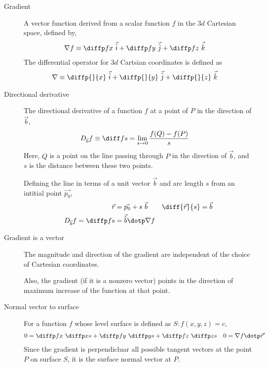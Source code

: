 \begin{description}
    \item[Gradient] A vector function derived from a scalar function $ f $ in the $ 3d $
          Cartesian space, defined by,
          \begin{align}
              \nabla f & \equiv \diffp fx\ \vec{\hat{i}} + \diffp fy\ \vec{\hat{j}}
              + \diffp fz\ \vec{\hat{k}}
          \end{align}
          The differential operator for $ 3d $ Cartsian coordinates is defined as
          \begin{align}
              \nabla & \equiv \diffp {}{x}\ \vec{\hat{i}} + \diffp {}{y}\ \vec{\hat{j}}
              + \diffp {}{z}\ \vec{\hat{k}}
          \end{align}

    \item[Directional derivative] The directional derivative of a function $ f $ at a
          point of $ P $ in the direction of $ \vec{b} $,
          \begin{align}
              D_{\vec{b}}f & \equiv \diff fs =
              \lim_{s \to 0} \frac{f(Q) - f(P)}{s}
          \end{align}
          Here, $ Q $ is a point on the line passing through $ P $ in the direction of
          $ \vec{b} $, and $ s $ is the distance between these two points. \par
          Defining the line in terms of a unit vector $ \vec{b} $ and arc length $ s $ from
          an intitial point $ \vec{p_0} $,
          \begin{align}
              \vec{r}                  & = \vec{p_0} + s\ \vec{b}       &
              \diff{\vec{r}}{s}        & = \vec{b}                        \\
              D_{\vec{b}}f = \diffp fs & = \vec{\hat{b}} \dotp \nabla f
          \end{align}

    \item[Gradient is a vector] The magnitude and direction of the gradient are
          independent of the choice of Cartesian coordinates. \par
          Also, the gradient (if it is a nonzero vector) points in the direction of maximum
          increase of the function at that point.

    \item[Normal vector to surface] For a function $ f $ whose level surface is defined
          as $ S : f(x, y, z) = c $,
          \begin{align}
              0 & = \diffp fx\ \diffp xs + \diffp fy\ \diffp ys + \diffp fz\ \diffp zs &
              0 & = \nabla f \dotp \vec{r}'
          \end{align}
          Since the gradient is perpendicluar all possible tangent vectors at the point
          $ P $ on surface $ S $, it is the surface normal vector at $ P $.


\end{description}
